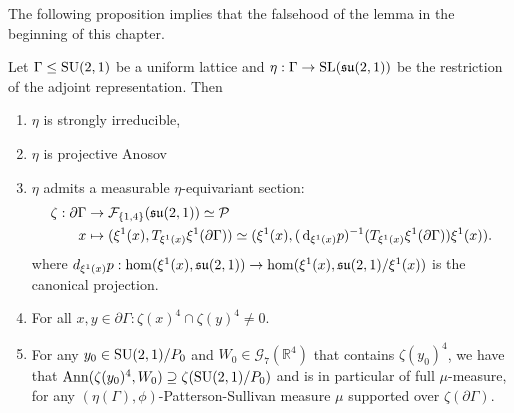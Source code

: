 \documentclass{report}
\begin{document}
The following proposition implies that the falsehood of the lemma in the beginning of this chapter.
\begin{proposition}
    Let $\Gamma \leq \operatorname{{\mathrm{SU}}}(2,1)$ be a uniform lattice and $\eta: \Gamma \to \operatorname{{\mathrm{SL}}}(\mathfrak{su}(2,1))$ be the restriction of the adjoint representation.
    Then
    \begin{enumerate}[label=(\roman*)]
        \item $\eta$ is strongly irreducible,
        \item $\eta$ is projective Anosov
        \item $\eta$ admits a measurable $\eta$-equivariant section: 
        \begin{align*}
            \zeta: \partial \Gamma &\to \mathcal F_{\{1, 4 \}}(\mathfrak{su}(2,1)) \simeq \mathcal P\\
            x &\mapsto (\xi^1(x), T_{\xi^1(x)} \xi^1(\partial \Gamma)) \simeq (\xi^1(x), (\,\mathrm{d}_{\xi^1(x)}p)^{-1}(T_{\xi^1(x)}\xi^1(\partial \Gamma))\xi^1(x)).
        \end{align*}
        where $d_{\xi^1(x)}p: \hom( \xi^1(x), \operatorname{{\mathfrak{su}}}(2,1)) \to \hom(\xi^1(x), \operatorname{{\mathfrak{su}}}(2,1)/ \xi^1(x))$ is the canonical projection.
        \item For all $x, y \in \partial \Gamma: \zeta(x)^4 \cap \zeta(y)^4 \neq 0$.
        \item For any $y_0 \in \operatorname{{\mathrm{SU}}}(2,1)/P_0$ and 
        $W_0 \in \mathcal G_7(\mathbb R^4)$ that contains $\zeta(y_0)^4$, we have that 
        $\operatorname{Ann}(\zeta(y_0)^4, W_0) \supseteq \zeta(\operatorname{{\mathrm{SU}}}(2,1)/P_0)$ and is in particular of full $\mu$-measure, for any $(\eta(\Gamma), \phi)$-Patterson-Sullivan measure $\mu$ supported over
        $\zeta(\partial \Gamma)$.
    \end{enumerate}
\end{proposition}
\end{document}
